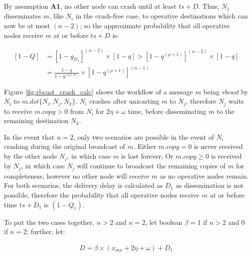 By assumption \textbf{A1}, no other node can crash until at least $ts+D$. Thus, $N_j$ disseminates $m$, like $N_i$ in the crash-free case, to operative destinations which can now be at most $(n-2)$; so the approximate probability that all operative nodes receive $m$ at or before $ts +D$ is:

        
        \begin{equation}
            \begin{aligned}
                \left[1-Q\right] &= \left[1 - g_{D_1}\right] ^{(n - 2)} \times \left[1-q\right] > \left[1-q ^ {(\rho + 1)}\right] ^ {(n - 2)} \times \left[1-q\right] \\[2em]
                & = \frac{1 - q}{1-q^{(\rho + 1)}} \times \left[1 - q ^ {(\rho + 1)}\right] ^ {(n - 1)}
            \end{aligned}
        \end{equation}

Figure \ref{fig:rbcast_crash_calc} shows the workflow of a message $m$ being \emph{rbcast} by $N_i$ to $m.dst \{N_i, N_j, N_k\}$.  $N_i$ crashes after unicasting $m$ to $N_j$, therefore $N_j$ waits to receive $m.copy > 0$ from $N_i$ for $2\eta + \omega$ time, before disseminating $m$ to the remaining destination $N_k$.  

In the event that $n = 2$, only two scenarios are possible in the event of $N_i$ crashing during the original broadcast of $m$.  Either $m.copy = 0$ is never received by the other node $N_j$, in which case $m$ is lost forever; Or $m.copy \geq 0$ is received by $N_j$, in which case $N_j$ will continue to broadcast the remaining copies of $m$ for completeness, however no other node will receive $m$ as no operative nodes remain.  For both scenarios, the delivery delay is calculated as $D_1$ as dissemination is not possible, therefore the probability that all operative nodes receive $m$ at or before time $ts+D_1$ is $(1-Q_1)$.  

To put the two cases together, $n > 2$ and $n = 2$, let boolean $\beta = 1$ if $n>2$ and $0$ if $n=2$; further, let: 

        \begin{equation}
            \begin{aligned}
                D=\beta\times(x_{mx}+2\eta+\omega)+D_1
            \end{aligned}
        \end{equation}
        
